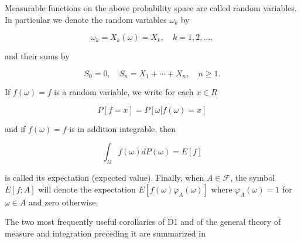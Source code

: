 Measurable functions on the above probability space are called random variables. In particular we denote the random variables $\omega_k$ by

$$\omega_k = X_k(\omega) = X_k, \quad k = 1, 2, \ldots,$$

and their sums by

$$S_0 = 0, \quad S_n = X_1 + \cdots + X_n, \quad n \geq 1.$$

If $f(\omega) = f$ is a random variable, we write for each $x \in R$

$$P[f = x] = P[\omega | f(\omega) = x]$$

and if $f(\omega) = f$ is in addition integrable, then

$$\int_{\Omega} f(\omega) dP(\omega) = E[f]$$

is called its expectation (expected value). Finally, when $A \in \mathcal{F}$, the symbol $E[f;A]$ will denote the expectation $E[f(\omega)\varphi_A(\omega)]$ where $\varphi_A(\omega) = 1$ for $\omega \in A$ and zero otherwise.

The two most frequently useful corollaries of D1 and of the general theory of measure and integration preceding it are summarized in